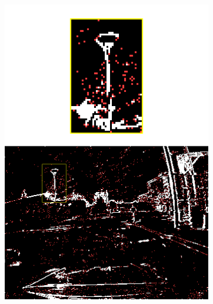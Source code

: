 \begin{figure}[t]
\begin{subfigure}{0.225\linewidth}
    \includegraphics[width=\linewidth]{mainmatter/figures/3_optical_flow/denoising_filling/input_noise_overlaid.png}
    \caption{}\label{subfig:ebof:denoising_filling:noise}
  \end{subfigure}
  \hspace{1mm}
  \begin{subfigure}{0.225\linewidth}
    \centering

\end{subfigure}
\end{figure}
